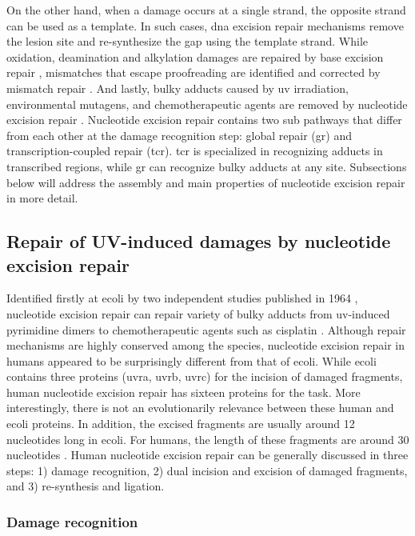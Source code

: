 On the other hand, when a damage occurs at a single strand, the opposite strand can be used as a template. In such cases, \gls{dna} excision repair mechanisms remove the lesion site and re-synthesize the gap using the template strand. While oxidation, deamination and alkylation damages are repaired by base excision repair \citep{klungland1999base}, mismatches that escape proofreading are identified and corrected by mismatch repair \citep{modrich1997strand}. And lastly, bulky adducts caused by \gls{uv} irradiation, environmental mutagens, and chemotherapeutic agents are removed by nucleotide excision repair \citep{reardon2005nucleotide}. Nucleotide excision repair contains two sub pathways that differ from each other at the damage recognition step: global repair (\gls{gr}) and transcription-coupled repair (\gls{tcr}). \gls{tcr} is specialized in recognizing adducts in transcribed regions, while \gls{gr} can recognize bulky adducts at any site. Subsections below will address the assembly and main properties of nucleotide excision repair in more detail.  

\subsection{Repair of UV-induced damages by nucleotide excision repair}

Identified firstly at \gls{ecoli} by two independent studies published in 1964 \citep{boyce1964release,setlow1964disappearance}, nucleotide excision repair can repair variety of bulky adducts from \gls{uv}-induced pyrimidine dimers to chemotherapeutic agents such as cisplatin \citep{yimit2019differential}. Although repair mechanisms are highly conserved among the species, nucleotide excision repair in humans appeared to be surprisingly different from that of \gls{ecoli}. While \gls{ecoli} contains three proteins (\gls{uvra}, \gls{uvrb}, \gls{uvrc}) for the incision of damaged fragments, human nucleotide excision repair has sixteen proteins for the task. More interestingly, there is not an evolutionarily relevance between these human and \gls{ecoli} proteins. In addition, the excised fragments are usually around 12 nucleotides long in \gls{ecoli}. For humans, the length of these fragments are around 30 nucleotides \citep{sancar2016mechanisms}. Human nucleotide excision repair can be generally discussed in three steps: 1) damage recognition, 2) dual incision and excision of damaged fragments, and 3) re-synthesis and ligation.  

\subsubsection{Damage recognition}

